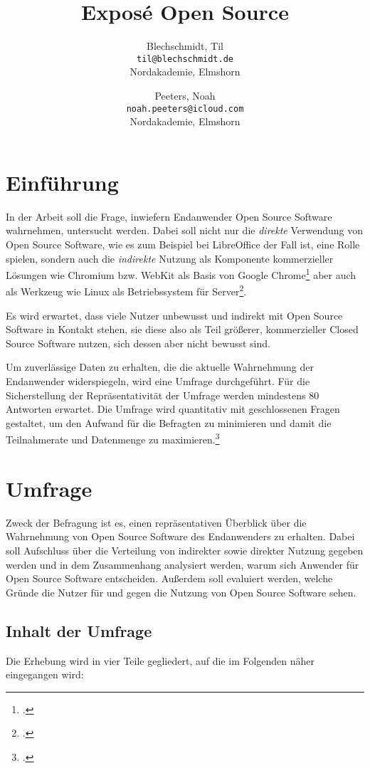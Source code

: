 \documentclass[a4paper]{article}
\title{Exposé Open Source}
\author{
  Blechschmidt, Til\\
  \texttt{til@blechschmidt.de}\\
  Nordakademie, Elmshorn
  \and
  Peeters, Noah\\
  \texttt{noah.peeters@icloud.com}\\
  Nordakademie, Elmshorn
}
\begin{document}
	\maketitle
	
	\section{Einführung}
		In der Arbeit soll die Frage, inwiefern Endanwender Open Source Software wahrnehmen, untersucht werden. Dabei soll nicht nur die \emph{direkte} Verwendung von Open Source Software, wie es zum Beispiel bei LibreOffice der Fall ist, eine Rolle spielen, sondern auch die \emph{indirekte} Nutzung als Komponente kommerzieller Lösungen wie Chromium bzw. WebKit als Basis von Google Chrome\footcite{is:open:source:right:for:you} aber auch als Werkzeug wie Linux als Betriebssystem für Server\footcite{report:BaselineScenario}.
		
		Es wird erwartet, dass viele Nutzer unbewusst und indirekt mit Open Source Software in Kontakt stehen, sie diese also als Teil größerer, kommerzieller Closed Source Software nutzen, sich dessen aber nicht bewusst sind.
		
		Um zuverlässige Daten zu erhalten, die die aktuelle Wahrnehmung der Endanwender widerspiegeln, wird eine Umfrage durchgeführt. Für die Sicherstellung der Repräsentativität der Umfrage werden mindestens 80 Antworten erwartet.
		Die Umfrage wird quantitativ mit geschlossenen Fragen gestaltet, um den Aufwand für die Befragten zu minimieren und damit die Teilnahmerate und Datenmenge zu maximieren.\footcite{handbuch:methoden}
	
	\section{Umfrage}
		Zweck der Befragung ist es, einen repräsentativen Überblick über die Wahrnehmung von Open Source Software des Endanwenders zu erhalten. Dabei soll Aufschluss über die Verteilung von indirekter sowie direkter Nutzung gegeben werden und in dem Zusammenhang analysiert werden, warum sich Anwender für Open Source Software entscheiden. Außerdem soll evaluiert werden, welche Gründe die Nutzer für und gegen die Nutzung von Open Source Software sehen.
	
		\subsection{Inhalt der Umfrage}
			Die Erhebung wird in vier Teile gegliedert, auf die im Folgenden näher eingegangen wird: 
		   
\end{document}

